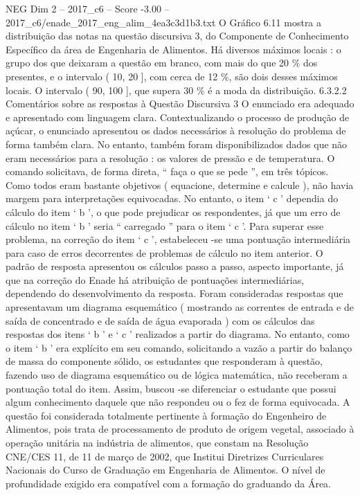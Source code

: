 \begin{textsample}{NEG Dim 2 – 2017\_c6 – Score -3.00 – 2017\_c6/enade\_2017\_eng\_alim\_4ea3c3d1b3.txt}
O Gráfico 6.11 mostra a distribuição das notas na questão discursiva 3, do Componente de Conhecimento Específico da área de Engenharia de Alimentos.
Há diversos máximos locais : o grupo dos que deixaram a questão em branco, com mais do que 20 \% dos presentes, e o intervalo ( 10, 20 ], com cerca de 12 \%, são dois desses máximos locais.
O intervalo ( 90, 100 ], que supera 30 \% é a moda da distribuição. 6.3.2.2 Comentários sobre as respostas à Questão Discursiva 3 O enunciado era adequado e apresentado com linguagem clara.
Contextualizando o processo de produção de açúcar, o enunciado apresentou os dados necessários à resolução do problema de forma também clara.
No entanto, também foram disponibilizados dados que não eram necessários para a resolução : os valores de pressão e de temperatura.
O comando solicitava, de forma direta, “ faça o que se pede ”, em três tópicos.
Como todos eram bastante objetivos ( equacione, determine e calcule ), não havia margem para interpretações equivocadas.
No entanto, o item ‘ c ’ dependia do cálculo do item ‘ b ’, o que pode prejudicar os respondentes, já que um erro de cálculo no item ‘ b ’ seria “ carregado ” para o item ‘ c ’.
Para superar esse problema, na correção do item ‘ c ’, estabeleceu -se uma pontuação intermediária para caso de erros decorrentes de problemas de cálculo no item anterior.
O padrão de resposta apresentou os cálculos passo a passo, aspecto importante, já que na correção do Enade há atribuição de pontuações intermediárias, dependendo do desenvolvimento da resposta.
Foram consideradas respostas que apresentavam um diagrama esquemático ( mostrando as correntes de entrada e de saída de concentrado e de saída de água evaporada ) com os cálculos das respostas dos itens ‘ b ’ e ‘ c ’ realizados a partir do diagrama.
No entanto, como o item ‘ b ’ era explícito em seu comando, solicitando a vazão a partir do balanço de massa do componente sólido, os estudantes que responderam à questão, fazendo uso de diagrama esquemático ou de lógica matemática, não receberam a pontuação total do item.
Assim, buscou -se diferenciar o estudante que possui algum conhecimento daquele que não respondeu ou o fez de forma equivocada.
A questão foi considerada totalmente pertinente à formação do Engenheiro de Alimentos, pois trata de processamento de produto de origem vegetal, associado à operação unitária na indústria de alimentos, que constam na Resolução CNE/CES 11, de 11 de março de 2002, que Institui Diretrizes Curriculares Nacionais do Curso de Graduação em Engenharia de Alimentos.
O nível de profundidade exigido era compatível com a formação do graduando da Área.

\end{textsample}
